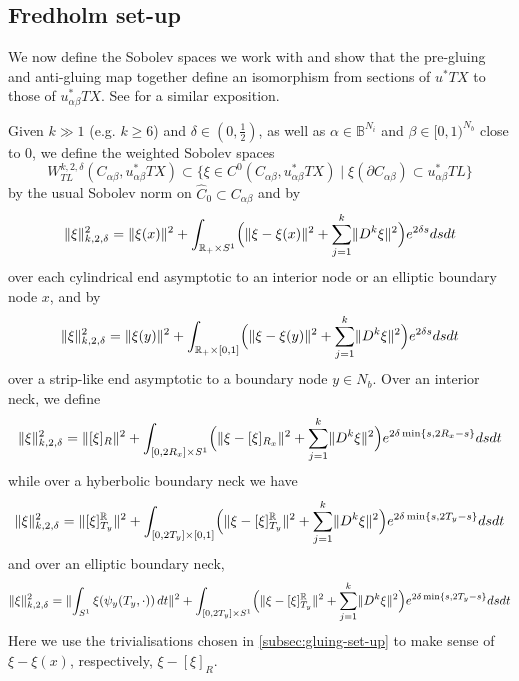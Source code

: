 \documentclass[11pt,psamsfonts, oneside, reqno]{amsart}
\newcommand{\sub}{\subset}%
\newcommand{\norm}[1]{\lVert#1\rVert}
\newcommand{\lbr}[1]{\Bigl(#1\Bigr)}
\newcommand{\del}{\partial}
\newcommand{\bB}{\mathbb{B}}
\newcommand{\bR}{\mathbb{R}}
\newcommand{\wh}{\widehat}
\theoremstyle{definition}
\theoremstyle{remark}
\numberwithin{equation}{section}
\begin{document}
\subsection{Fredholm set-up} 
We now define the Sobolev spaces we work with and show that the pre-gluing and anti-gluing map together define an isomorphism from sections of $u^*TX$ to those of $u_{\alpha\beta}^*TX$. See \cite{Jem20} for a similar exposition.\par
Given $k \gg 1$ (e.g. $k \geq 6$) and $\delta \in (0,\frac12)$, as well as $\alpha\in \bB^{N_i}$ and $\beta \in [0,1)^{N_b}$ close to $0$, we define the weighted Sobolev spaces 
$$W^{k,2,\delta}_{TL}(C_{\alpha\beta},u_{\alpha\beta}^*TX)\sub \{\xi \in C^0(C_{\alpha\beta},u_{\alpha\beta}^*TX)\mid \xi(\del C_{\alpha\beta})\sub u_{\alpha\beta}^*TL\}$$\noindent
by the usual Sobolev norm on $\wh C_0 \sub C_{\alpha\beta}$ and by 
\begin{equation}\label{eq:norm-interior-end} \norm{\xi}_{k,2,\delta}^2 = \norm{\xi(x)}^2+\int_{\bR_+\times S^1}\lbr{\norm{\xi-\xi(x)}^2 + \sum_{j =1}^{k}\norm{D^k\xi}^2}e^{2\delta s}dsdt  \end{equation}
over each cylindrical end asymptotic to an interior node or an elliptic boundary node $x$, and by 
\begin{equation}\label{eq:norm-boundary-end}  \norm{\xi}_{k,2,\delta}^2 = \norm{\xi(y)}^2+\int_{\bR_+\times [0,1]}\lbr{\norm{\xi-\xi(y)}^2 + \sum_{j =1}^{k}\norm{D^k\xi}^2}e^{2\delta s}dsdt \end{equation}
over a strip-like end asymptotic to a boundary node $y\in N_b$. Over an interior neck, we define 
\begin{equation}\label{eq:norm-interior-neck}  \norm{\xi}_{k,2,\delta}^2 = \norm{[\xi]_R}^2 + \int_{[0,2R_x]\times S^1}\lbr{\norm{\xi-[\xi]_{R_x}}^2 + \sum_{j =1}^{k}\norm{D^k\xi}^2}e^{2\delta \min\{s,2R_x-s\}}dsdt\end{equation}
while over a hyberbolic boundary neck we have 
\begin{equation}\label{eq:norm-boundary-neck}  \norm{\xi}_{k,2,\delta}^2 = \norm{[\xi]_{T_y}^\bR}^2 + \int_{[0,2T_y]\times [0,1]}\lbr{\norm{\xi-[\xi]_{T_y}^\bR}^2 + \sum_{j =1}^{k}\norm{D^k\xi}^2}e^{2\delta \min\{s,2T_y-s\}}dsdt\end{equation}
and over an elliptic boundary neck,
\begin{equation}\label{eq:norm-elliptic-boundary-neck}  \norm{\xi}_{k,2,\delta}^2 = \norm{\int_{S^1}\xi(\psi_y(T_y,\cdot))\,dt}^2 + \int_{[0,2T_y]\times S^1}\lbr{\norm{\xi-[\xi]_{T_y}^\bR}^2 + \sum_{j =1}^{k}\norm{D^k\xi}^2}e^{2\delta \min\{s,2T_y-s\}}dsdt\end{equation}
Here we use the trivialisations chosen in \textsection\ref{subsec:gluing-set-up} to make sense of $\xi-\xi(x)$, respectively, $\xi-[\xi]_R$.
\end{document}
